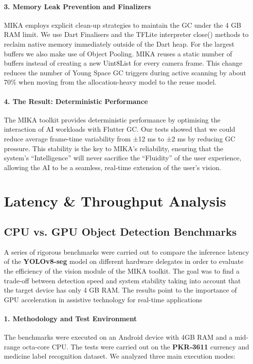 \documentclass[12pt,a4paper]{report}
\begin{document}
\paragraph{3. Memory Leak Prevention and Finalizers}
MIKA employs explicit clean-up strategies to maintain the GC under the 4 GB RAM limit. We use Dart Finalisers and the TFLite interpreter close() methods to reclaim native memory immediately outside of the Dart heap. For the largest buffers we also make use of Object Pooling. MIKA reuses a static number of buffers instead of creating a new Uint8List for every camera frame. This change reduces the number of Young Space GC triggers during active scanning by about 70\% when moving from the allocation-heavy model to the reuse model.

\paragraph{4. The Result: Deterministic Performance}
The MIKA toolkit provides deterministic performance by optimising the interaction of AI workloads with Flutter GC. Our tests showed that we could reduce average frame-time variability from ±12 ms to ±2 ms by reducing GC pressure. This stability is the key to MIKA’s reliability, ensuring that the system’s “Intelligence” will never sacrifice the “Fluidity” of the user experience, allowing the AI to be a seamless, real-time extension of the user’s vision.

\section{Latency \& Throughput Analysis}
\subsection{CPU vs. GPU Object Detection Benchmarks}
A series of rigorous benchmarks were carried out to compare the inference latency of the \textbf{YOLOv8-seg} model on different hardware delegates in order to evaluate the efficiency of the vision module of the MIKA toolkit. The goal was to find a trade-off between detection speed and system stability taking into account that the target device has only 4 GB RAM. The results point to the importance of GPU acceleration in assistive technology for real-time applications

\paragraph{1. Methodology and Test Environment}
The benchmarks were executed on an Android device with 4GB RAM and a mid-range octa-core CPU. The tests were carried out on the \textbf{PKR-3611} currency and medicine label recognition dataset. We analyzed three main execution modes:
\end{document}
